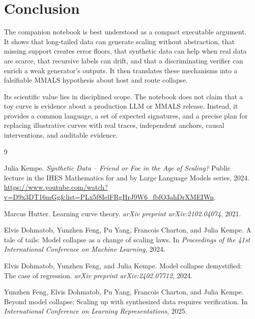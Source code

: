 \documentclass[10pt]{article}
\begin{document}
\section{Conclusion}

The companion notebook is best understood as a compact executable argument. It shows that long-tailed data can generate scaling without abstraction, that missing support creates error floors, that synthetic data can help when real data are scarce, that recursive labels can drift, and that a discriminating verifier can enrich a weak generator's outputs. It then translates these mechanisms into a falsifiable MMALS hypothesis about host and route collapse.

Its scientific value lies in disciplined scope. The notebook does not claim that a toy curve is evidence about a production LLM or MMALS release. Instead, it provides a common language, a set of expected signatures, and a precise plan for replacing illustrative curves with real traces, independent anchors, causal interventions, and auditable evidence.

\begin{thebibliography}{9}

Julia Kempe.
\newblock \emph{Synthetic Data -- Friend or Foe in the Age of Scaling?}
\newblock Public lecture in the IHES Mathematics for and by Large Language Models series, 2024.
\newblock \url{https://www.youtube.com/watch?v=D9x3DT16mGg&list=PLx5f8IelFRgHrJ9W6_fbfO3ahDrXMEIWn}.

Marcus Hutter.
\newblock Learning curve theory.
\newblock \emph{arXiv preprint arXiv:2102.04074}, 2021.

Elvis Dohmatob, Yunzhen Feng, Pu Yang, Francois Charton, and Julia Kempe.
\newblock A tale of tails: Model collapse as a change of scaling laws.
\newblock In \emph{Proceedings of the 41st International Conference on Machine Learning}, 2024.

Elvis Dohmatob, Yunzhen Feng, and Julia Kempe.
\newblock Model collapse demystified: The case of regression.
\newblock \emph{arXiv preprint arXiv:2402.07712}, 2024.

Yunzhen Feng, Elvis Dohmatob, Pu Yang, Francois Charton, and Julia Kempe.
\newblock Beyond model collapse: Scaling up with synthesized data requires verification.
\newblock In \emph{International Conference on Learning Representations}, 2025.

\end{thebibliography}
\end{document}
